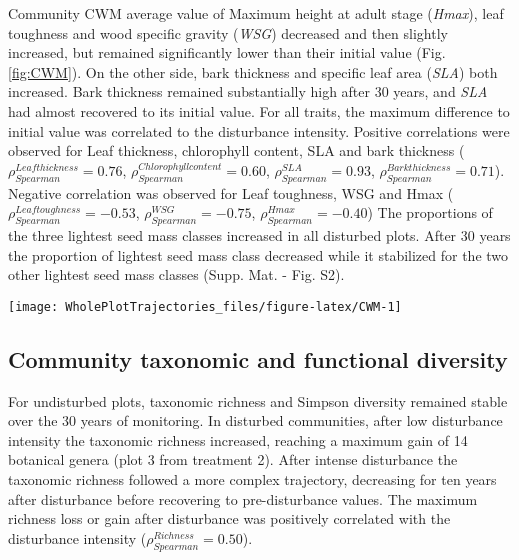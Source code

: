 \documentclass[fleqn,10pt]{ArtEcoFoG} %
\begin{document}
Community CWM average value of Maximum height at adult stage
(\emph{Hmax}), leaf toughness and wood specific gravity (\emph{WSG})
decreased and then slightly increased, but remained significantly lower
than their initial value (Fig. \ref{fig:CWM}). On the other side, bark
thickness and specific leaf area (\emph{SLA}) both increased. Bark
thickness remained substantially high after 30 years, and \emph{SLA} had
almost recovered to its initial value. For all traits, the maximum
difference to initial value was correlated to the disturbance intensity.
Positive correlations were observed for Leaf thickness, chlorophyll
content, SLA and bark thickness
(\(\rho_{Spearman}^{Leaf thickness}=0.76\),
\(\rho_{Spearman}^{Chlorophyll content}=0.60\),
\(\rho_{Spearman}^{SLA}=0.93\),
\(\rho_{Spearman}^{Bark thickness}=0.71\)). Negative correlation was
observed for Leaf toughness, WSG and Hmax
(\(\rho_{Spearman}^{Leaf toughness}=-0.53\),
\(\rho_{Spearman}^{WSG}=-0.75\), \(\rho_{Spearman}^{Hmax}=-0.40\)) The
proportions of the three lightest seed mass classes increased in all
disturbed plots. After 30 years the proportion of lightest seed mass
class decreased while it stabilized for the two other lightest seed mass
classes (Supp. Mat. - Fig. S2).

\begin{figure*}

{\centering \texttt{[image: WholePlotTrajectories\_files/figure-latex/CWM-1]} 

}

\caption{Trajectories of community weighted means over 30 years after disturbance of four leaf traits (Leaf thickness, chlorophyll content, toughness, and specific area), two stem traits (wood specific gravity, and bark thickness) and one life history trait (Specific maximum height at adult stage). }\label{fig:CWM}
\end{figure*}

\subsection{Community taxonomic and functional
diversity}\label{community-taxonomic-and-functional-diversity}

For undisturbed plots, taxonomic richness and Simpson diversity remained
stable over the 30 years of monitoring. In disturbed communities, after
low disturbance intensity the taxonomic richness increased, reaching a
maximum gain of 14 botanical genera (plot 3 from treatment 2). After
intense disturbance the taxonomic richness followed a more complex
trajectory, decreasing for ten years after disturbance before recovering
to pre-disturbance values. The maximum richness loss or gain after
disturbance was positively correlated with the disturbance intensity
(\(\rho_{Spearman}^{Richness}=0.50\)).
\end{document}
